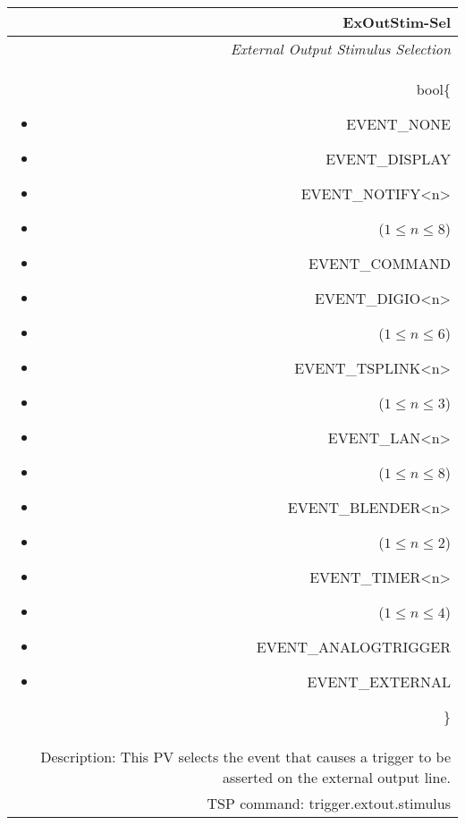 \documentclass[openany]{article}
\begin{document}
		\begin{tabular}{N}
			\hline
			\bfseries ExOutStim-Sel\label{pv:exoutstim-sel} \\ \hline
			\emph{External Output Stimulus Selection} \\
			bool\{\begin{itemize}[noitemsep]
				\small
				\item[] EVENT\_NONE
				\item[] EVENT\_DISPLAY
				\item[] EVENT\_NOTIFY\textless n\textgreater
				\item[] ($1\leq n\leq 8$)
				\item[] EVENT\_COMMAND
				\item[] EVENT\_DIGIO\textless n\textgreater
				\item[] ($1\leq n\leq 6$)
				\item[] EVENT\_TSPLINK\textless n\textgreater
				\item[] ($1\leq n\leq 3$)
				\item[] EVENT\_LAN\textless n\textgreater
				\item[] ($1\leq n\leq 8$)
				\item[] EVENT\_BLENDER\textless n\textgreater 
				\item[] ($1\leq n\leq 2$)
				\item[] EVENT\_TIMER\textless n\textgreater
				\item[] ($1\leq n\leq 4$)
				\item[] EVENT\_ANALOGTRIGGER
				\item[] EVENT\_EXTERNAL
			\end{itemize}\} \\
			Description: This PV selects the event that causes a trigger to be asserted on the external output line. \\
			TSP command: trigger.extout.stimulus
		\end{tabular}
\end{document}
